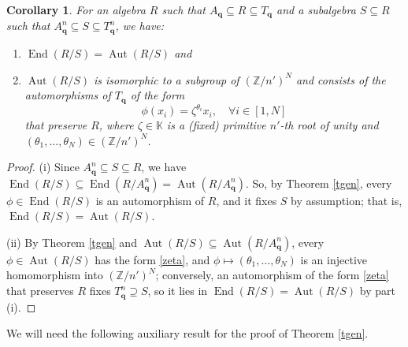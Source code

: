 \documentclass[11pt]{amsart}
\theoremstyle{plain}
\newtheorem{corollary}[theorem]{Corollary}
\newcommand \bco[1] { \begin{corollary}\label{c#1} }
\newcommand {\eco} { \end{corollary} }
\newcommand \thref[1]{Theorem \ref{t#1}}
\def \KK {{\mathbb C}}
\def \KK {{\mathbb K}}
\def \Zset {{\mathbb Z}}
\DeclareMathOperator \Aut { {\mathrm{Aut}} }
\DeclareMathOperator \End { {\mathrm{End}} }
\begin{document}
\bco{repeat} For an algebra $R$ such that $A_{\mathbf{q}} \subseteq R \subseteq T_{\mathbf{q}}$ and a subalgebra $S \subseteq R$ such that 
 $A_{\mathbf{q}}^n \subseteq S \subseteq T_{\mathbf{q}}^n$, we have:
 \begin{enumerate}
 \item[(i)] $\End(R/S)=\Aut(R/S)$ and 
 \item[(ii)]
 $\Aut(R/S)$ is isomorphic to a subgroup of $(\Zset/n')^N$ and consists of the automorphisms of $T_{\mathbf{q}}$ of the form 
\begin{equation}
\label{zeta}
\phi(x_i) = \zeta^{\theta_i} x_i, \quad \forall i \in [1,N]
\end{equation} 
that preserve $R$, where $\zeta \in \KK$ is a (fixed) primitive $n'$-th root of unity and $(\theta_1, \ldots, \theta_N) \in (\Zset/n')^N$.
\end{enumerate}
\eco
\begin{proof}(i) Since $A_{\mathbf{q}}^n \subseteq S \subseteq R$, we have
$\End(R/S) \subseteq \End(R/A_{\mathbf{q}}^n) =\Aut(R/A_{\mathbf{q}}^n)$. So, by \thref{gen}, every $\phi \in \End(R/S)$ is an automorphism of $R$, and it fixes $S$ by assumption; that is, $\End(R/S) = \Aut(R/S)$.

(ii) By \thref{gen} and $\Aut(R/S) \subseteq \Aut(R/A_{\mathbf{q}}^n)$, every $\phi \in \Aut(R/S)$ has the form \eqref{zeta}, and $\phi \mapsto (\theta_1, \ldots, \theta_N)$ is an injective homomorphism into $(\Zset/n')^N$; conversely, an automorphism of the form \eqref{zeta} that preserves $R$ fixes $T_{\mathbf{q}}^n \supseteq S$, so it lies in $\End(R/S) = \Aut(R/S)$ by part (i).
\end{proof}
We will need the following auxiliary result for the proof of \thref{gen}. 
\end{document}

